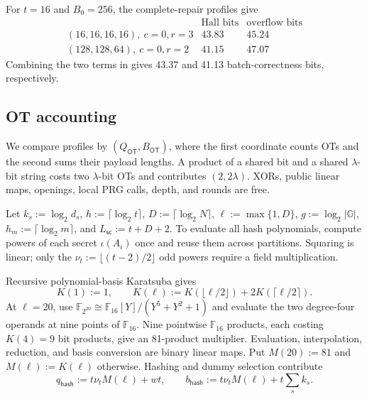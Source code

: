 For $t=16$ and $B_0=256$, the complete-repair profiles give
\[
\begin{array}{c|cc}
 & \text{Hall bits} & \text{overflow bits}\\ \hline
(16,16,16,16),\ c=0,r=3 & 43.83 & 45.24\\
(128,128,64),\ c=0,r=2 & 41.15 & 47.07
\end{array}
\]
Combining the two terms in
 gives 43.37 and 41.13
batch-correctness bits, respectively.

\subsection{OT accounting}\label{sec:waterfallMpcCost}

We compare profiles by $(Q_{\mathsf{OT}},B_{\mathsf{OT}})$, where the first
coordinate counts OTs and the second sums their payload lengths.  A product of
a shared bit and a shared $\lambda$-bit string costs two $\lambda$-bit OTs and
contributes $(2,2\lambda)$.  XORs, public linear maps, openings, local PRG
calls, depth, and rounds are free.

Let $k_s:=\log_2d_s$, $h:=\lceil\log_2t\rceil$,
$D:=\lceil\log_2N\rceil$, $\ell:=\max\{1,D\}$,
$g:=\log_2|\mathbb G|$, $h_m:=\lceil\log_2m\rceil$, and
$L_{\mathsf{sc}}:=t+D+2$.  To evaluate all hash polynomials, compute powers
of each secret $\iota(A_i)$ once and reuse them across partitions.  Squaring
is linear; only the $\nu_t:=\lfloor(t-2)/2\rfloor$ odd powers require a field
multiplication.

Recursive polynomial-basis Karatsuba gives
\begin{equation}\label{eq:waterfall-karatsuba-cost}
 K(1):=1,
 \qquad
 K(\ell):=K(\lfloor\ell/2\rfloor)+2K(\lceil\ell/2\rceil).
\end{equation}
At $\ell=20$, use
$\mathbb F_{2^{20}}\cong\mathbb F_{16}[Y]/(Y^5+Y^2+1)$ and evaluate the two
degree-four operands at nine points of $\mathbb F_{16}$.  Nine pointwise
$\mathbb F_{16}$ products, each costing $K(4)=9$ bit products, give an
81-product multiplier.  Evaluation, interpolation, reduction, and basis
conversion are binary linear maps.  Put $M(20):=81$ and
$M(\ell):=K(\ell)$ otherwise.  Hashing and dummy selection contribute
\begin{equation}\label{eq:waterfall-hash-ot-cost}
 q_{\mathsf{hash}}:=t\nu_tM(\ell)+wt,
 \qquad
 b_{\mathsf{hash}}:=t\nu_tM(\ell)+t\sum_sk_s.
\end{equation}

